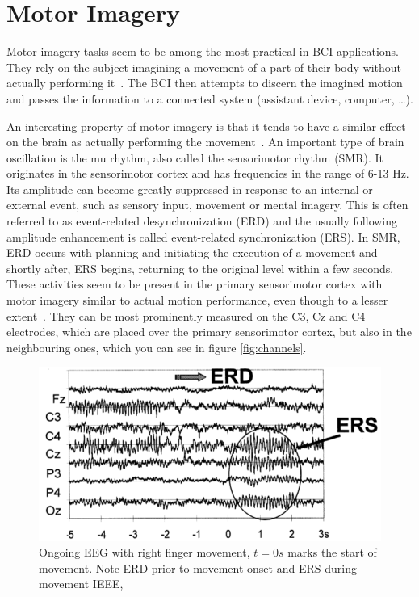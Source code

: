 \documentclass[english, he, bc, kiv, iso690alph, viewonly]{fasthesis}
\begin{document}
\section{Motor Imagery}
\label{sec:mi}

Motor imagery tasks seem to be among the most practical in BCI applications.
They rely on the subject imagining a movement of a part of their body without actually performing it~\cite{craik:dl:eeg:rev:19}.
The BCI then attempts to discern the imagined motion and passes the information to a connected system (assistant device, computer, \dots).

An interesting property of motor imagery is that it tends to have a similar effect on the brain as actually performing the movement~\cite{pfurtscheller:mi:01}. An important type of brain oscillation is the mu rhythm, also called the sensorimotor rhythm (SMR). It originates in the sensorimotor cortex and has frequencies in the range of 6-13 Hz. Its amplitude can become greatly suppressed in response to an internal or external event, such as sensory input, movement or mental imagery. This is often referred to as event-related desynchronization (ERD) and the usually following amplitude enhancement is called event-related synchronization (ERS). In SMR, ERD occurs with planning and initiating the execution of a movement and shortly after, ERS begins, returning to the original level within a few seconds. These activities seem to be present in the primary sensorimotor cortex with motor imagery similar to actual motion performance, even though to a lesser extent~\cite{pfurtscheller:mi:01}. They can be most prominently measured on the C3, Cz and C4 electrodes, which are placed over the primary sensorimotor cortex, but also in the neighbouring ones, which you can see in figure \ref{fig:channels}.

\begin{figure}
	\includegraphics[width=\textwidth]{fig/erders.png}
	\caption[EEG signal with visible ERD and ERS]{Ongoing EEG with right finger movement, $t=0s$ marks the start of movement. Note ERD prior to movement onset and ERS during movement  IEEE,~\cite{pfurtscheller:mi:01}}
\end{figure}
\end{document}
